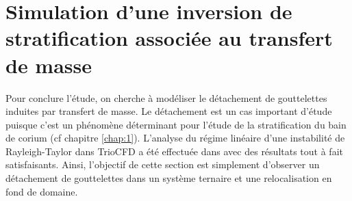 \chapter{Simulation d'une inversion de stratification associée au transfert de masse}

Pour conclure l'étude, on cherche à modéliser le détachement de gouttelettes induites par transfert de masse. Le détachement est un cas important d'étude puisque c'est un phénomène déterminant pour l'étude de la stratification du bain de corium (cf chapitre \ref{chap:1}). L'analyse du régime linéaire d'une instabilité de Rayleigh-Taylor dans TrioCFD a été effectuée dans \cite{rasolofomanana_modelisation_nodate} avec des résultats tout à fait satisfaisants. Ainsi, l'objectif de cette section est simplement d'observer un détachement de gouttelettes dans un système ternaire et une relocalisation en fond de domaine.
